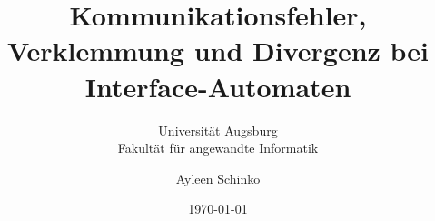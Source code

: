 \begin{titlepage}
\titlehead{\center{}Bachelorarbeit\\
im Studiengang Bachelor Informatik}
\title{Kommunikationsfehler, Verklemmung und Divergenz bei Interface-Automaten}
\date{\today}
\author{Ayleen Schinko}
\subtitle{\vspace{1cm}Universität Augsburg\\
Fakultät für angewandte Informatik}

\publishers{Aufgabensteller: Prof. Dr. Walter Vogler}

\maketitle
\end{titlepage}
